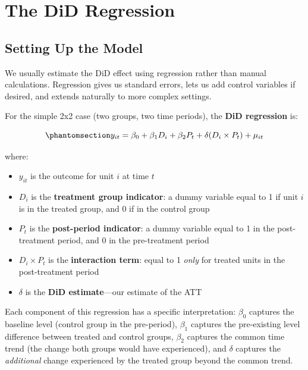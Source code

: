 \documentclass[
  letterpaper,
  DIV=11,
  numbers=noendperiod]{scrreprt}
\providecommand{\tightlist}{%
  \setlength{\itemsep}{0pt}\setlength{\parskip}{0pt}}
\begin{document}
\section{The DiD Regression}\label{the-did-regression}

\subsection{Setting Up the Model}\label{setting-up-the-model-1}

We usually estimate the DiD effect using regression rather than manual
calculations. Regression gives us standard errors, lets us add control
variables if desired, and extends naturally to more complex settings.

For the simple 2x2 case (two groups, two time periods), the \textbf{DiD
regression} is:

\begin{equation}\protect\phantomsection\label{eq-did-reg}{
y_{it} = \beta_0 + \beta_1 D_i + \beta_2 P_t + \delta(D_i \times P_t) + \mu_{it}
}\end{equation}

where:

\begin{itemize}
\tightlist
\item
  \(y_{it}\) is the outcome for unit \(i\) at time \(t\)
\item
  \(D_i\) is the \textbf{treatment group indicator}: a dummy variable
  equal to 1 if unit \(i\) is in the treated group, and 0 if in the
  control group
\item
  \(P_t\) is the \textbf{post-period indicator}: a dummy variable equal
  to 1 in the post-treatment period, and 0 in the pre-treatment period
\item
  \(D_i \times P_t\) is the \textbf{interaction term}: equal to 1
  \emph{only} for treated units in the post-treatment period
\item
  \(\delta\) is the \textbf{DiD estimate}---our estimate of the ATT
\end{itemize}

Each component of this regression has a specific interpretation:
\(\beta_0\) captures the baseline level (control group in the
pre-period), \(\beta_1\) captures the pre-existing level difference
between treated and control groups, \(\beta_2\) captures the common time
trend (the change both groups would have experienced), and \(\delta\)
captures the \emph{additional} change experienced by the treated group
beyond the common trend.
\end{document}
